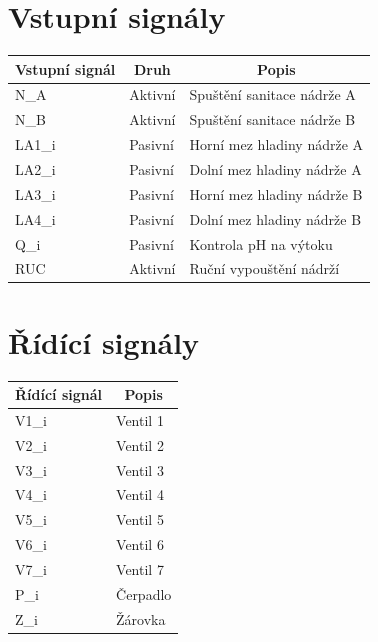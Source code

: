 \documentclass[12pt]{report}
\begin{document}
	\section{Vstupní signály}
	\begin{table}[]
		\begin{tabular}{lll}
			\hline
			\multicolumn{1}{c}{Vstupní signál} 	& \multicolumn{1}{c}{Druh} & \multicolumn{1}{c}{Popis}  \\ \hline
			N\_A                                & Aktivní                  & Spuštění sanitace nádrže A \\
			N\_B                                & Aktivní                  & Spuštění sanitace nádrže B \\
			LA1\_i                              & Pasivní                  & Horní mez hladiny nádrže A \\
			LA2\_i                              & Pasivní                  & Dolní mez hladiny nádrže A \\
			LA3\_i                              & Pasivní                  & Horní mez hladiny nádrže B \\
			LA4\_i                              & Pasivní                  & Dolní mez hladiny nádrže B \\
			Q\_i                                & Pasivní                  & Kontrola pH na výtoku      \\
			RUC                                 & Aktivní                  & Ruční vypouštění nádrží    \\ \hline
		\end{tabular}
	\end{table}
	
	\section{Řídící signály}
	\begin{table}[]
		\begin{tabular}{ll}
			\hline
			\multicolumn{1}{c}{Řídící signál} 	& \multicolumn{1}{c}{Popis}  	\\ \hline
			V1\_i          					  	& Ventil 1      			   	\\
			V2\_i         					  	& Ventil 2      				\\
			V3\_i          					  	& Ventil 3      				\\
			V4\_i          					  	& Ventil 4      				\\
			V5\_i          					  	& Ventil 5      				\\
			V6\_i          					  	& Ventil 6      				\\
			V7\_i          					  	& Ventil 7      				\\
			P\_i          					  	& Čerpadlo      				\\
			Z\_i          					  	& Žárovka      					\\ \hline
		\end{tabular}
	\end{table}
	
\end{document}
